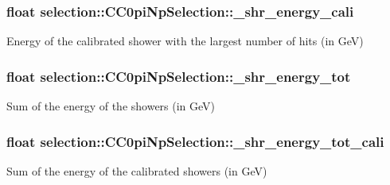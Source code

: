 \subsubsection[{\texorpdfstring{\+\_\+shr\+\_\+energy\+\_\+cali}{_shr_energy_cali}}]{\setlength{\rightskip}{0pt plus 5cm}float selection\+::\+C\+C0pi\+Np\+Selection\+::\+\_\+shr\+\_\+energy\+\_\+cali\hspace{0.3cm}{\ttfamily [private]}}\hypertarget{classselection_1_1CC0piNpSelection_a910f18dc66ac2f22aa8cbdd6b86c7d0e}{}\label{classselection_1_1CC0piNpSelection_a910f18dc66ac2f22aa8cbdd6b86c7d0e}
Energy of the calibrated shower with the largest number of hits (in GeV) 
\subsubsection[{\texorpdfstring{\+\_\+shr\+\_\+energy\+\_\+tot}{_shr_energy_tot}}]{\setlength{\rightskip}{0pt plus 5cm}float selection\+::\+C\+C0pi\+Np\+Selection\+::\+\_\+shr\+\_\+energy\+\_\+tot\hspace{0.3cm}{\ttfamily [private]}}\hypertarget{classselection_1_1CC0piNpSelection_a6e42f011e79f646f36df7148907d1b59}{}\label{classselection_1_1CC0piNpSelection_a6e42f011e79f646f36df7148907d1b59}
Sum of the energy of the showers (in GeV) 
\subsubsection[{\texorpdfstring{\+\_\+shr\+\_\+energy\+\_\+tot\+\_\+cali}{_shr_energy_tot_cali}}]{\setlength{\rightskip}{0pt plus 5cm}float selection\+::\+C\+C0pi\+Np\+Selection\+::\+\_\+shr\+\_\+energy\+\_\+tot\+\_\+cali\hspace{0.3cm}{\ttfamily [private]}}\hypertarget{classselection_1_1CC0piNpSelection_aae69f88600d31bb3456808268fb63c1c}{}\label{classselection_1_1CC0piNpSelection_aae69f88600d31bb3456808268fb63c1c}
Sum of the energy of the calibrated showers (in GeV) 
